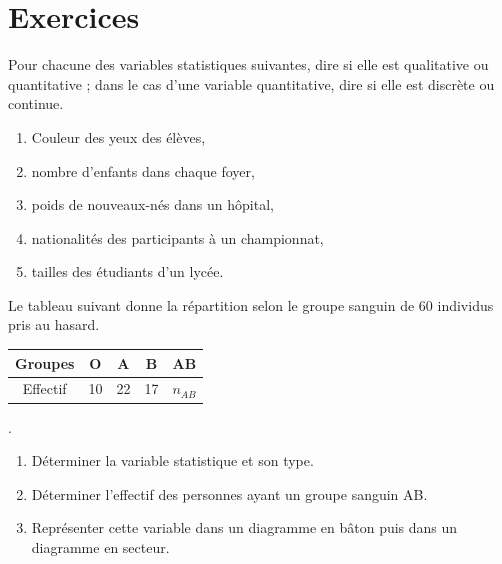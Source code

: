 \TCDLessonStyleOff
\clearpage
\providecommand{\cov}[2]{\mathrm{Cov}\left( #1 , #2 \right)}
\providecommand{\var}[1]{\mathrm{Var}\left( #1 \right)}
\section{Exercices}
      \begin{exo}
            Pour chacune des variables statistiques suivantes, dire si elle est qualitative ou quantitative ; 
            dans le cas d'une variable quantitative, dire si elle est discr\`ete ou continue.
            \begin{enumerate}
                  \item Couleur des yeux des \'el\`eves,
                  \item nombre d'enfants dans chaque foyer,
                  \item poids de nouveaux-n\'es dans un h\^opital,
                  \item nationalit\'es des participants \`a un championnat,
                  \item tailles des \'etudiants d'un lyc\'ee.
            \end{enumerate}
      \end{exo}
      \begin{exo}
            Le tableau suivant donne la répartition selon le groupe sanguin de 60 individus pris au hasard.
            \begin{table}[H]
                  \centering
                        \begin{tabular}[b]{|c|c|c|c|c|}
                        \hline 
                        Groupes & O & A & B & AB \\ 
                        \hline 
                        Effectif & 10 & 22 & 17 & $n_{AB}$ \\ 
                        \hline 
                  \end{tabular}. 
            \end{table}
            \begin{enumerate}
                  \item Déterminer la variable statistique et son type.
                  \item Déterminer l’effectif des personnes ayant un groupe sanguin AB.
                  \item Repr\'esenter cette variable dans un diagramme en b\^aton
                        puis dans un diagramme en secteur.
            \end{enumerate}
      \end{exo}
